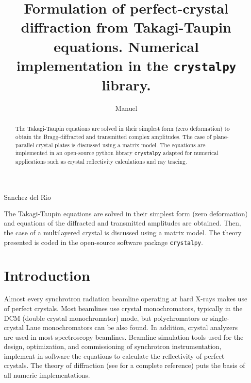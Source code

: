 \documentclass[preprint]{iucr}              %
\begin{document}

\title{Formulation of perfect-crystal diffraction  from Takagi-Taupin equations. Numerical implementation in the \texttt{crystalpy} library.}


\author[a]{Manuel}{Sanchez del Rio}



\maketitle   %

\begin{synopsis}
The Takagi-Taupin equations are solved in their simplest form (zero deformation) and equations of the diffracted and transmitted amplitudes are obtained. Then, the case of a multilayered crystal is discussed using a matrix model. The theory presented is coded in the open-source software package {\tt crystalpy}.
\end{synopsis}

\begin{abstract}

The Takagi-Taupin equations are solved in their simplest form (zero deformation) to obtain the Bragg-diffracted and transmitted complex amplitudes. The case of plane-parallel crystal plates is discussed using a matrix model. The equations are implemented in an open-source python library \texttt{crystalpy} adapted for numerical applications such as crystal reflectivity calculations and ray tracing.

\end{abstract}


%
\section{Introduction}
\label{sec:Intro}

Almost every synchrotron radiation beamline operating at hard X-rays makes use of perfect crystals.  
Most beamlines use crystal monochromators, typically in the DCM (double crystal monochromator) mode, but polychromators or single-crystal Laue monochromators can be also found. In addition, crystal analyzers are used in most spectroscopy beamlines. 
Beamline simulation tools used for the design, optimization, and commissioning of synchrotron instrumentation, implement in software the equations to calculate the reflectivity of perfect crystals. The theory of diffraction (see \cite{authierbook} for a complete reference) puts the basis of all numeric implementations. 
\end{document}
